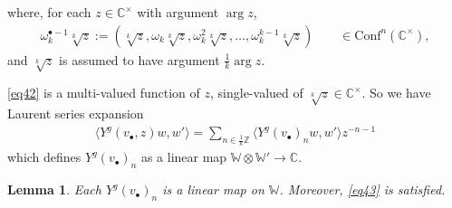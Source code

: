 \documentclass[12pt,a4paper,notitlepage]{article}
\theoremstyle{definition}
\theoremstyle{plain}
\newtheorem{lm}[df]{Lemma}
\newcommand{\Conf}{\mathrm{Conf}}
\newcommand{\bk}[1]{\langle {#1}\rangle}
\newcommand{\blt}{\bullet}
\newcommand{\Wbb}{\mathbb W}
\newcommand{\Cbb}{\mathbb C}
\newcommand{\Zbb}{\mathbb Z}
\numberwithin{equation}{section}
\begin{document}
where, for each $z\in\Cbb^\times$ with argument $\arg z$, \index{zz@$\omega_k^{\blt-1}\sqrt[k]{z}$}
\begin{align}
\omega_k^{\blt-1}\sqrt[k]{z}:=(\sqrt[k]{z},\omega_k\sqrt[k]{z},\omega_k^2\sqrt[k]{z},\dots,\omega_k^{k-1}\sqrt[k]{z})	\qquad \in\Conf^n(\Cbb^\times),\label{eq48}
\end{align}
and $\sqrt[k]z$ is assumed to have argument $\frac 1k\arg z$.

\eqref{eq42} is a multi-valued function of $z$, single-valued of $\sqrt[k]{z}\in\Cbb^\times$. So we have Laurent series expansion
\begin{align*}
\bk{Y^g(v_\blt,z)w,w'}=\sum_{n\in\frac 1k\Zbb}\bk{Y^g(v_\blt)_nw,w'}	z^{-n-1}
\end{align*}
which defines $Y^g(v_\blt)_n$ as a linear map $\Wbb\otimes\Wbb'\rightarrow\Cbb$.

\begin{lm}
Each $Y^g(v_\blt)_n$ is a linear map on $\Wbb$. Moreover, \eqref{eq43} is satisfied.
\end{lm}
\end{document}
